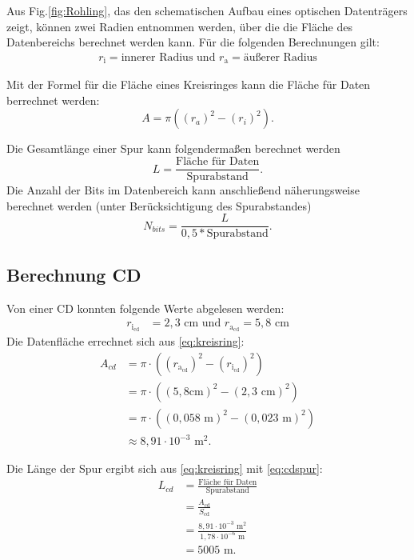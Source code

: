\documentclass[9pt,twocolumn,twoside]{pnas-new}
\begin{document}
Aus Fig.\ref{fig:Rohling}, das den schematischen Aufbau eines optischen Datenträgers zeigt, können zwei Radien entnommen werden, über die die Fläche des Datenbereichs berechnet werden kann.
Für die folgenden Berechnungen gilt: \begin{align*} r_{\mbox{i}}  = \mbox{innerer Radius und } r_{\mbox{a}} = \mbox{äußerer Radius} \end{align*} 


Mit der Formel für die Fläche eines Kreisringes \cite[Seite 147]{Bartsch2014} kann die Fläche für Daten berrechnet werden: \begin{equation} \label{eq:kreisring} A = \pi((r_a)^2-(r_i)^2).  \end{equation}

Die Gesamtlänge einer Spur kann folgendermaßen berechnet werden \begin{equation} \label{eq:gesamtlänge} L = \frac{\mbox{Fläche für Daten}}{\mbox{Spurabstand}}. \end{equation}
Die Anzahl der Bits im Datenbereich kann anschließend näherungsweise berechnet werden (unter Berücksichtigung des Spurabstandes) \begin{equation} \label{eq:bitanzahl} N_{bits} = \frac{L}{0,5*\mbox{Spurabstand}}. \end{equation}

\subsection{Berechnung CD}
Von einer CD konnten folgende Werte abgelesen werden:
\begin{align*}
 r_{\mbox{i}_{\mbox{cd}}} &= 2,3 \mbox{ cm und } r_{\mbox{a}_{\mbox{cd}}} = 5,8 \mbox{ cm}
 \end{align*} 
\indent Die Datenfläche errechnet sich aus \eqref{eq:kreisring}:
\begin{align*}
 A_{cd} &= \pi\cdot((r_{\mbox{a}_{\mbox{cd}}})^2-(r_{\mbox{i}_{\mbox{cd}}})^2)\\	
&= \pi\cdot((5,8\mbox{cm})^2-(2,3\mbox{ cm})^2) \\
 &=  \pi\cdot((0,058\mbox{ m})^2-(0,023\mbox{ m})^2) \\
 &\approx  8,91\cdot10^{-3}\mbox{ m}^2.
\end{align*}

Die Länge der Spur ergibt sich aus \eqref{eq:kreisring} mit \eqref{eq:cdspur}:
\begin{align*}
 L_{cd} &= \frac{\mbox{Fläche für Daten}}{\mbox{Spurabstand}}\\
 &= \frac{A_{\mbox{cd}}}{S_{\mbox{cd}}}\\
 &= \frac{8,91\cdot10^{-3}\mbox{ m}^2}{1,78\cdot10^{-6}\mbox{ m} }\\
 &= 5005\mbox{ m}.
\end{align*}
\end{document}
